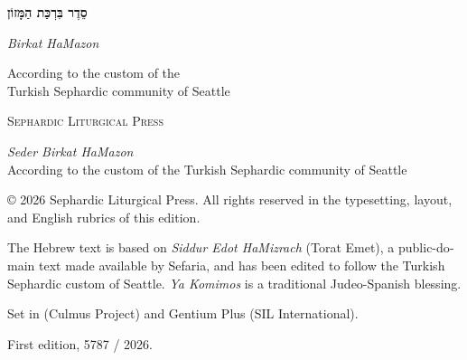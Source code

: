 
\thispagestyle{empty}
\vspace*{\fill}
\begin{center}
  {\LARGE\bfseries סֵדֶר בִּרְכַּת הַמָּזוֹן\par}
  \medskip
  \begin{otherlanguage}{english}
    {\large\itshape Birkat HaMazon\par}
    \bigskip
    {\small According to the custom of the\\
     Turkish Sephardic community of Seattle\par}
  \end{otherlanguage}
\end{center}
\vspace*{\fill}
\begin{center}
  \begin{otherlanguage}{english}
    {\small\scshape Sephardic Liturgical Press\par}
  \end{otherlanguage}
\end{center}
\clearpage

\thispagestyle{empty}
\begin{otherlanguage}{english}
\footnotesize\raggedright
\vspace*{\fill}

\textit{Seder Birkat HaMazon}\\
According to the custom of the Turkish Sephardic community of Seattle

\medskip
© 2026 Sephardic Liturgical Press. All rights reserved in the typesetting,
layout, and English rubrics of this edition.

\medskip
The Hebrew text is based on \textit{Siddur Edot HaMizrach} (Torat Emet), a
public-domain text made available by Sefaria, and has been edited to follow
the Turkish Sephardic custom of Seattle. \textit{Ya Komimos} is a traditional
Judeo-Spanish blessing.

\medskip
Set in \pressHebrewFontName{} (Culmus Project) and Gentium Plus
(SIL International).

\medskip
First edition, 5787 / 2026.

\vspace*{\fill}
\end{otherlanguage}

